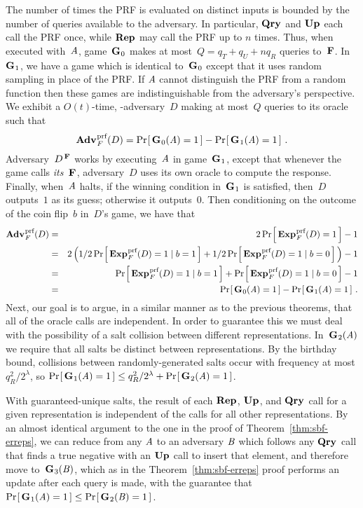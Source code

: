 The number of times the PRF is evaluated on distinct inputs is bounded by the
number of queries available to the adversary. In particular, $\textup{\textbf{Qry}}\hspace{0.5pt}$ and $\textup{\textbf{Up}}\hspace{0.5pt}$
each call the PRF once, while $\textup{\textbf{Rep}}\hspace{0.5pt}$ may call the PRF up to $n$ times. Thus,
when executed with~$\mathit{A}$, game~$\textup{\textbf{G}}\hspace{0.5pt}_0$ makes at most~$Q = q_T + q_U + nq_R$
queries to~$\textup{\textbf{F}}\hspace{0.5pt}$.
%
In~$\textup{\textbf{G}}\hspace{0.5pt}_1$, we have a game which is identical to~$\textup{\textbf{G}}\hspace{0.5pt}_0$ except that it uses
random sampling in place of the PRF. If $\mathit{A}$ cannot distinguish the PRF from
a random function then these games are indistinguishable from the adversary's
perspective.
%
We exhibit a $O(t)$-time, \prf-adversary~$D$ making at most~$Q$ queries to its
oracle such that
%
\begin{equation}
  \Adv{\prf}_F(D) = \Prob{\game_0(\advA)=1} - \Prob{\game_1(\advA)=1} \,.
\end{equation}
%
Adversary~$D^{\,\textup{\textbf{F}}\hspace{0.5pt}}$ works by executing~$\mathit{A}$ in game~$\textup{\textbf{G}}\hspace{0.5pt}_1$, except
that whenever the game calls \emph{its}~$\textup{\textbf{F}}\hspace{0.5pt}$, adversary~$D$ uses its
own oracle to compute the response.
%
Finally, when~$\mathit{A}$ halts, if the winning condition in~$\textup{\textbf{G}}\hspace{0.5pt}_1$ is satisfied,
then~$D$ outputs~$1$ as its guess; otherwise it outputs~$0$.
%
Then conditioning on the outcome of the coin flip~$b$ in~$D$'s game, we have that
%
\begin{eqnarray}
  \Adv{\prf}_F(D) &=&
    2\Prob{\Exp{\prf}_F(D)=1}-1 \\
  &=&
    2\,\Big(
      1/2\Prob{\Exp{\prf}_F(D)=1 \given b=1} + 1/2\Prob{\Exp{\prf}_F(D)=1 \given b=0}
    \Big) - 1 \\
  &=&
    \Prob{\Exp{\prf}_F(D)=1 \given b=1} + \Prob{\Exp{\prf}_F(D)=1 \given b=0}
     - 1 \\
  &=& \Prob{\game_0(\advA)=1} - \Prob{\game_1(\advA)=1} \,.
\end{eqnarray}
%
Next, our goal is to argue, in a similar manner as to the previous theorems, that all
of the oracle calls are independent. In order to guarantee this we must deal
with the possibility of a salt collision between different representations.
In~$\textup{\textbf{G}}\hspace{0.5pt}_2(\mathit{A})$ we require that all salts be distinct between
representations. By the birthday bound, collisions between randomly-generated
salts occur with frequency at most $q_R^2/2^\lambda$, so $\Pr\hspace{-1pt}\left[\,\textup{\textbf{G}}\hspace{0.5pt}_1(\mathit{A}) =
1\,\right] \le q_R^2/2^\lambda + \Pr\hspace{-1pt}\left[\,\textup{\textbf{G}}\hspace{0.5pt}_2(\mathit{A}) = 1\,\right]$.

With guaranteed-unique salts, the result of each $\textup{\textbf{Rep}}\hspace{0.5pt}$, $\textup{\textbf{Up}}\hspace{0.5pt}$, and $\textup{\textbf{Qry}}\hspace{0.5pt}$
call for a given representation is independent of the calls for all other
representations. By an almost identical argument to the one in the proof of
Theorem~\ref{thm:sbf-erreps}, we can reduce from any $\mathit{A}$ to an adversary
$\mathit{B}$ which follows any $\textup{\textbf{Qry}}\hspace{0.5pt}$ call that finds a true negative with an
$\textup{\textbf{Up}}\hspace{0.5pt}$ call to insert that element, and therefore move to~$\textup{\textbf{G}}\hspace{0.5pt}_3(\mathit{B})$,
which as in the Theorem~\ref{thm:sbf-erreps} proof performs an update after each
query is made, with the guarantee that $\Pr\hspace{-1pt}\left[\,\textup{\textbf{G}}\hspace{0.5pt}_1(\mathit{A}) = 1\,\right] \le
\Pr\hspace{-1pt}\left[\,\textup{\textbf{G}}\hspace{0.5pt}_2(\mathit{B}) = 1\,\right]$.

